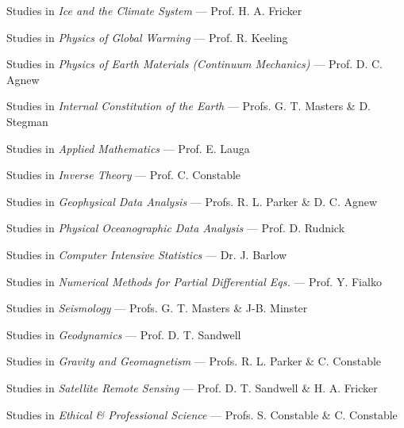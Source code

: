 \begin{frontmatter}
\begin{vitapage}
\begin{coursework}
  \item Studies in {\sl Ice and the Climate System} --- Prof. H. A. Fricker
  \item Studies in {\sl Physics of Global Warming} --- Prof. R. Keeling
  \item Studies in {\sl Physics of Earth Materials (Continuum Mechanics)} --- Prof. D. C. Agnew
  \item Studies in {\sl Internal Constitution of the Earth} --- Profs. G. T. Masters \& D. Stegman
  \item Studies in {\sl Applied Mathematics} --- Prof. E. Lauga 
  \item Studies in {\sl Inverse Theory} --- Prof. C. Constable 
  \item Studies in {\sl Geophysical Data Analysis} --- Profs. R. L. Parker \& D. C. Agnew
  \item Studies in {\sl Physical Oceanographic Data Analysis} --- Prof. D. Rudnick 
  \item Studies in {\sl Computer Intensive Statistics} --- Dr. J. Barlow 
  \item Studies in {\sl Numerical Methods for Partial Differential Eqs.} --- Prof. Y. Fialko
  \item Studies in {\sl Seismology} --- Profs. G. T. Masters \& J-B. Minster
  \item Studies in {\sl Geodynamics} --- Prof. D. T. Sandwell
  \item Studies in {\sl Gravity and Geomagnetism} --- Profs. R. L. Parker \& C. Constable
  \item Studies in {\sl Satellite Remote Sensing} --- Prof. D. T. Sandwell \& H. A. Fricker
  \item Studies in {\sl Ethical \& Professional Science} --- Profs. S. Constable \& C. Constable
\end{coursework}

\end{vitapage}



\end{frontmatter}
